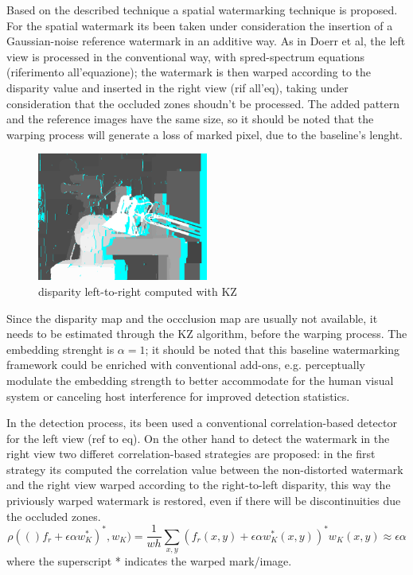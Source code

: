 Based on the described technique a spatial watermarking technique is proposed.\newline
For the spatial watermark its been taken under consideration the insertion of a Gaussian-noise reference watermark in an additive way.\newline
As in Doerr et al, the left view is processed in the conventional way, with spred-spectrum equations (riferimento all'equazione); the watermark is then warped according to the disparity value and inserted in the right view (rif all'eq), taking under consideration that the occluded zones shoudn't be processed.\newline
The added pattern and the reference images have the same size, so it should be noted that the warping process will generate a loss of marked pixel, due to the baseline's lenght.\newline
\begin{figure}[h!]
\centering
\includegraphics[width=0.5\textwidth]{./img/disp_left_to_right.png}
\caption{\small{disparity left-to-right computed with KZ}}
\label{fig:kzdisplr}
\end{figure}
Since the disparity map and the occclusion map are usually not available, it needs to be estimated through the KZ algorithm, before the warping process.\newline
The embedding strenght is $\alpha=1$; it should be noted that this baseline watermarking framework could be enriched with conventional add-ons, e.g. perceptually modulate the embedding strength to better accommodate for the human visual system or canceling host interference for improved detection statistics.\newline

In the detection process, its been used a conventional correlation-based detector for the left view (ref to eq).\newline 
On the other hand to detect the watermark in the right view two differet correlation-based strategies are proposed:\newline
in the first strategy its computed the correlation value between the non-distorted watermark and the right view warped according to the right-to-left disparity, this way the priviously warped watermark is restored, even if there will be discontinuities due the occluded zones.
$$\rho(()f_{r}+\epsilon\alpha w_{K}^{*})^{*},w_{K})= \frac{1}{wh}\sum_{x,y}(f_{r}(x,y)+\epsilon\alpha w_{K}^{*}(x,y))^{*}w_{K}(x,y)\approx\epsilon\alpha $$
where the superscript * indicates the warped mark/image.\newline

